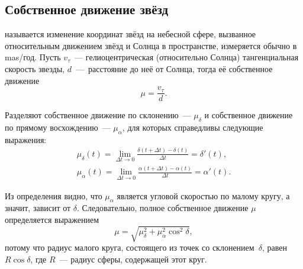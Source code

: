 \subsection{Собственное движение звёзд}
 называется изменение координат звёзд на небесной сфере, вызванное относительным движением звёзд и Солнца в пространстве, измеряется обычно в mas/год. Пусть $v_\tau$~--- гелиоцентрическая (относительно Солнца) тангенциальная скорость звезды, $d$~---~расстояние до неё от Солнца, тогда её собственное движение
\begin{equation}
    \mu = \frac{v_\tau}{d}.
\end{equation}

Разделяют собственное движение по склонению~--- $\mu_\delta$ и собственное движение по прямому восхождению~--- $\mu_\alpha$, для которых справедливы следующие выражения:
\begin{gather}
    \mu_\delta(t) = \lim_{\Delta t \rightarrow 0} \frac{\delta(t + \Delta t) - \delta(t)}{\Delta t} = \delta'(t),\\
    \mu_\alpha(t) = \lim_{\Delta t \rightarrow 0} \frac{\alpha(t + \Delta t) - \alpha(t)}{\Delta t} = \alpha'(t).
\end{gather}

Из определения видно, что $\mu_\alpha$ является угловой скоростью по малому кругу, а значит, зависит от $\delta$. Следовательно, полное собственное движение $\mu$ определяется выражением
\begin{equation}
    \mu = \sqrt{\mu_\delta^2 + \mu_\alpha^2 \cos^2 \delta},
\end{equation}
потому что радиус малого круга, состоящего из точек со склонением~$\delta$, равен $R \cos \delta$, где $R$~--- радиус сферы, содержащей этот круг.

